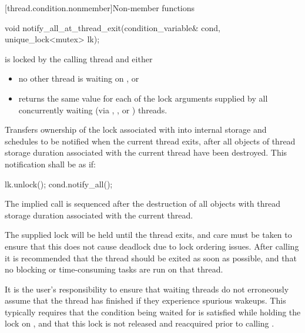 [thread.condition.nonmember]{Non-member functions}
%
\begin{itemdecl}
void notify_all_at_thread_exit(condition_variable& cond, unique_lock<mutex> lk);
\end{itemdecl}

\begin{itemdescr}
\pnum
\requires {} is locked by the calling thread and either

\begin{itemize}
\item no other thread is waiting on , or
\item {} returns the same value for each of the lock arguments
supplied by all concurrently waiting (via , ,
or ) threads.
\end{itemize}

\pnum
\effects Transfers ownership of the lock associated with  into
internal storage and schedules  to be notified when the current
thread exits, after all objects of thread storage duration associated with
the current thread have been destroyed. This notification shall be as if:
\begin{codeblock}
lk.unlock();
cond.notify_all();
\end{codeblock}

\pnum
\sync The implied  call is sequenced after the destruction of
all objects with thread storage duration associated with the current thread.

\pnum
\begin{note}
The supplied lock will be held until the thread exits, and care
must be taken to ensure that this does not cause deadlock due to lock
ordering issues. After calling  it is
recommended that the thread should be exited as soon as possible, and
that no blocking or time-consuming tasks are run on that thread.
\end{note}

\pnum
\begin{note}
It is the user's responsibility to ensure that waiting threads
do not erroneously assume that the thread has finished if they experience
spurious wakeups. This typically requires that the condition being waited
for is satisfied while holding the lock on , and that this lock
is not released and reacquired prior to calling .
\end{note}
\end{itemdescr}

